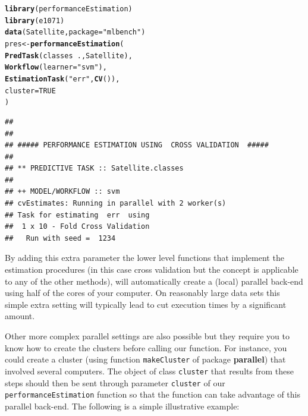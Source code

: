 \documentclass[10pt,a4paper]{article}\usepackage[]{graphicx}\usepackage[]{color}
\makeatletter
\newcommand{\hlnum}[1]{\textcolor[rgb]{0.686,0.059,0.569}{#1}}%
\newcommand{\hlstr}[1]{\textcolor[rgb]{0.192,0.494,0.8}{#1}}%
\newcommand{\hlopt}[1]{\textcolor[rgb]{0,0,0}{#1}}%
\newcommand{\hlstd}[1]{\textcolor[rgb]{0.345,0.345,0.345}{#1}}%
\newcommand{\hlkwb}[1]{\textcolor[rgb]{0.69,0.353,0.396}{#1}}%
\newcommand{\hlkwc}[1]{\textcolor[rgb]{0.333,0.667,0.333}{#1}}%
\newcommand{\hlkwd}[1]{\textcolor[rgb]{0.737,0.353,0.396}{\textbf{#1}}}%
\newenvironment{kframe}{%
 \def\at@end@of@kframe{}%
 \ifinner\ifhmode%
  \def\at@end@of@kframe{\end{minipage}}%
  \begin{minipage}{\columnwidth}%
 \fi\fi%
 \def\FrameCommand##1{\hskip\@totalleftmargin \hskip-\fboxsep
 \colorbox{shadecolor}{##1}\hskip-\fboxsep
     \hskip-\linewidth \hskip-\@totalleftmargin \hskip\columnwidth}%
 \MakeFramed {\advance\hsize-\width
   \@totalleftmargin\z@ \linewidth\hsize
   \@setminipage}}%
 {\par\unskip\endMakeFramed%
 \at@end@of@kframe}
\newenvironment{knitrout}{}{} %
\makeatother
\begin{document}
\begin{knitrout}\small
{}\color{fgcolor}\begin{kframe}
\begin{alltt}
\hlkwd{library}\hlstd{(performanceEstimation)}
\hlkwd{library}\hlstd{(e1071)}
\hlkwd{data}\hlstd{(Satellite,}\hlkwc{package}\hlstd{=}\hlstr{"mlbench"}\hlstd{)}
\hlstd{pres} \hlkwb{<-} \hlkwd{performanceEstimation}\hlstd{(}
    \hlkwd{PredTask}\hlstd{(classes} \hlopt{~} \hlstd{.,Satellite),}
    \hlkwd{Workflow}\hlstd{(}\hlkwc{learner}\hlstd{=}\hlstr{"svm"}\hlstd{),}
    \hlkwd{EstimationTask}\hlstd{(}\hlstr{"err"}\hlstd{,}\hlkwd{CV}\hlstd{()),}
    \hlkwc{cluster}\hlstd{=}\hlnum{TRUE}
    \hlstd{)}
\end{alltt}
\begin{verbatim}
## 
## 
## ##### PERFORMANCE ESTIMATION USING  CROSS VALIDATION  #####
## 
## ** PREDICTIVE TASK :: Satellite.classes
## 
## ++ MODEL/WORKFLOW :: svm 
## cvEstimates: Running in parallel with 2 worker(s)
## Task for estimating  err  using
##  1 x 10 - Fold Cross Validation
## 	 Run with seed =  1234
\end{verbatim}
\end{kframe}
\end{knitrout}

By adding this extra parameter the lower level functions that implement the estimation procedures (in this case cross validation but the concept is applicable to any of the other methods), will automatically create a (local) parallel back-end using half of the cores of your computer. On reasonably large data sets this simple extra setting will typically lead to cut execution times by a significant amount. 

Other more complex parallel settings are also possible but they require you to know how to create the clusters before calling our function. For instance, you could create a cluster (using function \texttt{makeCluster} of package \textbf{parallel}) that involved several computers. The object of class \texttt{cluster} that results from these steps should then be sent through parameter \texttt{cluster} of our \texttt{performanceEstimation} function so that the function can take advantage of this parallel back-end. The following is a simple illustrative example:
\end{document}
